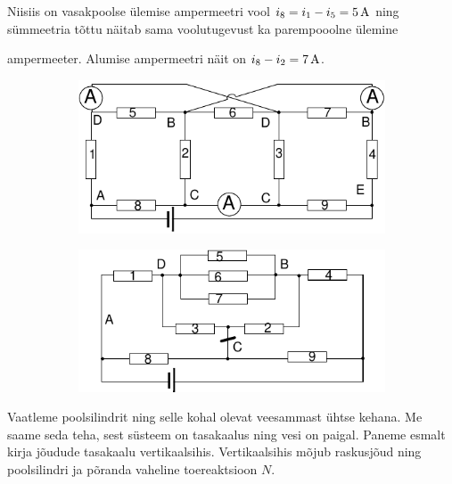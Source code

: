\documentclass[10pt]{article}
\begin{document}
Niisiis on vasakpoolse ülemise ampermeetri vool $i_8=i_1-i_5=\SI 5A$ ning sümmeetria tõttu näitab sama voolutugevust ka parempooolne ülemine
 
ampermeeter. Alumise ampermeetri näit on $i_8-i_2=\SI 7A$.\\

\begin{figure}[h]
    \centering
    \begin{subfigure}[h]{0.45\textwidth}
     \includegraphics[width=\textwidth]{2019-v3g-07-yl1.pdf}\\
    \end{subfigure}
    \begin{subfigure}[h]{0.45\textwidth}
    \vspace{-10pt}
     \includegraphics[width=\textwidth]{2019-v3g-07-yl2.pdf}
    \end{subfigure}
 \end{figure}
\probend
\bigskip


\solu
Vaatleme poolsilindrit ning selle kohal olevat veesammast ühtse kehana. Me saame seda teha, sest süsteem on tasakaalus ning vesi on paigal.
Paneme esmalt kirja jõudude tasakaalu vertikaalsihis.
Vertikaalsihis mõjub raskusjõud ning poolsilindri ja põranda vaheline toereaktsioon $N$.
\end{document}
